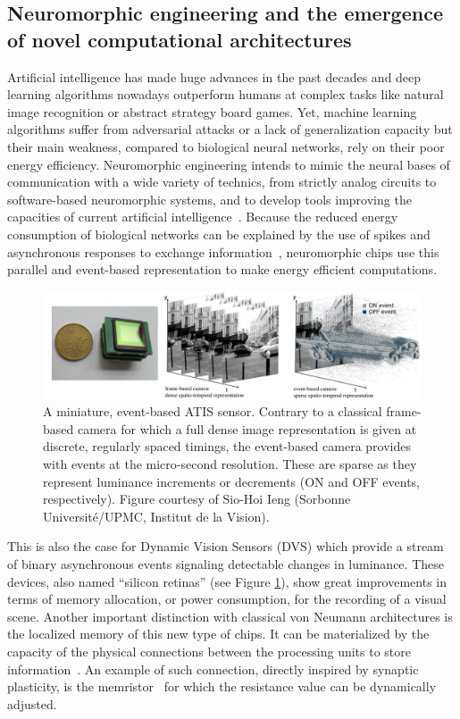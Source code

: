 \documentclass[brainsci, %
               review,submit,pdftex,moreauthors
               ]{Definitions/mdpi}
\begin{document}
\subsection{Neuromorphic engineering and the emergence of novel computational architectures}
%
Artificial intelligence has made huge advances in the past decades and deep learning algorithms nowadays outperform humans at complex tasks like natural image recognition or abstract strategy board games. Yet, machine learning algorithms suffer from adversarial attacks or a lack of generalization capacity but their main weakness, compared to biological neural networks, rely on their poor energy efficiency. Neuromorphic engineering intends to mimic the neural bases of communication with a wide variety of technics, from strictly analog circuits to software-based neuromorphic systems, and to develop tools improving the capacities of current artificial intelligence~\citep{roy_towards_2019}. Because the reduced energy consumption of biological networks can be explained by the use of spikes and asynchronous responses to exchange information~\citep{ref}, neuromorphic chips use this parallel and event-based representation to make energy efficient computations. 
%
\begin{figure}
\centering
\includegraphics[width=0.980\linewidth]{figures/event_driven_computations.png}
\caption{A miniature, event-based ATIS sensor. Contrary to a classical frame-based camera for which a full dense image representation is given at discrete, regularly spaced timings, the event-based camera provides with events at the micro-second resolution. These are sparse as they represent luminance increments or decrements (ON and OFF events, respectively). Figure courtesy of Sio-Hoi Ieng (Sorbonne Université/UPMC, Institut de la Vision).}\label{fig:silicon_retina}
\end{figure}
%
This is also the case for Dynamic Vision Sensors (DVS) which provide a stream of binary asynchronous events signaling detectable changes in luminance. These devices, also named ``silicon retinas'' (see Figure \ref{fig:silicon_retina}), show great improvements in terms of memory allocation, or power consumption, for the recording of a visual scene. Another important distinction with classical von Neumann architectures is the localized memory of this new type of chips. It can be materialized by the capacity of the physical connections between the processing units to store information~\citep{markovic_physics_2020}. An example of such connection, directly inspired by synaptic plasticity, is the memristor~\citep{rasetto_challenges_2022} for which the resistance value can be dynamically adjusted. 
\end{document}
